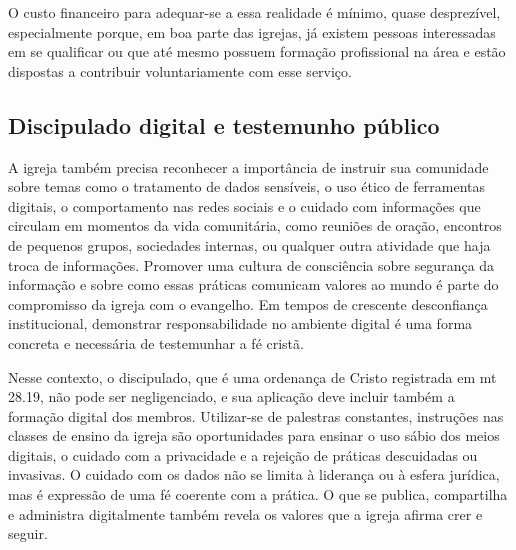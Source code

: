 O custo financeiro para adequar-se a essa realidade é mínimo, quase desprezível, especialmente porque, em boa parte das igrejas, já existem pessoas interessadas em se qualificar ou que até mesmo possuem formação profissional na área e estão dispostas a contribuir voluntariamente com esse serviço.

\subsection{Discipulado digital e testemunho público}

A igreja também precisa reconhecer a importância de instruir sua comunidade sobre temas como o tratamento de dados sensíveis, o uso ético de ferramentas digitais, o comportamento nas redes sociais e o cuidado com informações que circulam em momentos da vida comunitária, como reuniões de oração, encontros de pequenos grupos, sociedades internas, ou qualquer outra atividade que haja troca de informações. Promover uma cultura de consciência sobre segurança da informação e sobre como essas práticas comunicam valores ao mundo é parte do compromisso da igreja com o evangelho. Em tempos de crescente desconfiança institucional, demonstrar responsabilidade no ambiente digital é uma forma concreta e necessária de testemunhar a fé cristã.

Nesse contexto, o discipulado, que é uma ordenança de Cristo registrada em \gls{mt} 28.19, não pode ser negligenciado, e sua aplicação deve incluir também a formação digital dos membros. Utilizar-se de palestras constantes, instruções nas classes de ensino da igreja são oportunidades para ensinar o uso sábio dos meios digitais, o cuidado com a privacidade e a rejeição de práticas descuidadas ou invasivas. O cuidado com os dados não se limita à liderança ou à esfera jurídica, mas é expressão de uma fé coerente com a prática. O que se publica, compartilha e administra digitalmente também revela os valores que a igreja afirma crer e seguir.